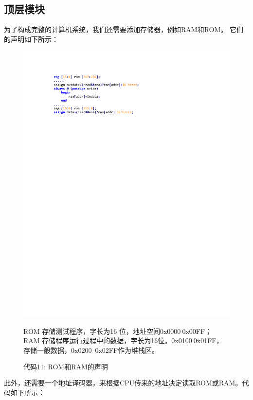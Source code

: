 \documentclass[titlepage, 11pt]{article}
\begin{document}
		\subsection{顶层模块}
			为了构成完整的计算机系统，我们还需要添加存储器，例如RAM和ROM。
			它们的声明如下所示：
			\begin{figure}[H]
				\centering
				\includegraphics[scale=1]{33.pdf}
				\caption*{代码11: ROM和RAM的声明}
				ROM 存储测试程序，字长为16 位，地址空间0x0000$~$0x00FF；
				RAM 存储程序运行过程中的数据，字长为16位。0x0100$~$0x01FF，存储一般数据，0x0200~0x02FF作为堆栈区。
			\end{figure}
			此外，还需要一个地址译码器，来根据CPU传来的地址决定读取ROM或RAM。代码如下所示：
\end{document}
